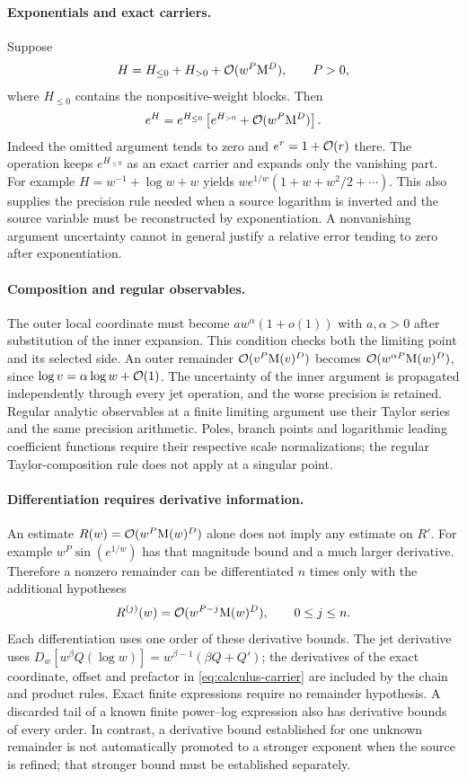 \paragraph{Exponentials and exact carriers.}
Suppose
\[
 H=H_{\le0}+H_{>0}+\mathcal O(w^P\mathrm M^D),\qquad P>0,
\]
where $H_{\le0}$ contains the nonpositive-weight blocks. Then
\[
 e^H=e^{H_{\le0}}
 \left[e^{H_{>0}}+\mathcal O(w^P\mathrm M^D)\right].
\]
Indeed the omitted argument tends to zero and $e^r=1+\mathcal O(r)$ there.
The operation keeps $e^{H_{\le0}}$ as an exact carrier and expands only
the vanishing part. For example $H=w^{-1}+\log w+w$ yields
$w e^{1/w}(1+w+w^2/2+\cdots)$. This also supplies the precision rule
needed when a source logarithm is inverted and the source variable must
be reconstructed by exponentiation. A nonvanishing argument uncertainty cannot in general justify a relative error tending to zero after exponentiation.

\paragraph{Composition and regular observables.}
The outer local coordinate must become $a w^\alpha(1+o(1))$ with
$a,\alpha>0$ after substitution of the inner expansion. This condition
checks both the limiting point and its selected side. An outer remainder
$\mathcal O(v^P\mathrm M(v)^D)$ becomes $\mathcal O(w^{\alpha P}\mathrm M(w)^D)$, since
$\log v=\alpha\log w+\mathcal O(1)$. The uncertainty of the inner argument is
propagated independently through every jet operation, and the worse
precision is retained. Regular analytic observables at a finite limiting
argument use their Taylor series and the same precision arithmetic.
Poles, branch points and logarithmic leading coefficient functions require
their respective scale normalizations; the regular Taylor-composition rule does not apply at a singular point.

\paragraph{Differentiation requires derivative information.}
An estimate $R(w)=\mathcal O(w^P\mathrm M(w)^D)$ alone does not imply any estimate on
$R'$. For example $w^P\sin(e^{1/w})$ has that magnitude bound and a much
larger derivative. Therefore a nonzero remainder can be differentiated
$n$ times only with the additional hypotheses
\[
 R^{(j)}(w)=\mathcal O(w^{P-j}\mathrm M(w)^D),\qquad 0\le j\le n.
\]
Each differentiation uses one order of these derivative bounds. The jet derivative uses
$D_w[w^\beta Q(\log w)]=w^{\beta-1}(\beta Q+Q')$; the derivatives
of the exact coordinate, offset and prefactor in
\eqref{eq:calculus-carrier} are included by the chain and product rules.
Exact finite expressions require no remainder hypothesis. A discarded tail
of a known finite power--log expression also has derivative bounds of every
order. In contrast, a derivative bound established for one unknown remainder
is not automatically promoted to a stronger exponent when the source is
refined; that stronger bound must be established separately.

